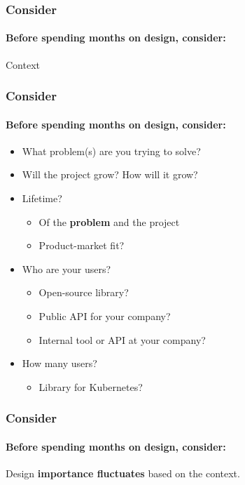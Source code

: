 
\begin{frame}
  \frametitle{Consider}
  \framesubtitle{Before spending months on design, consider:}

  \centering
  \LARGE Context
\end{frame}

\begin{frame}
  \frametitle{Consider}
  \framesubtitle{Before spending months on design, consider:}

  \begin{itemize}
    \item What problem(s) are you trying to solve?
    \pause
    \item Will the project grow? How will it grow?
    \pause
    \item Lifetime?
    \begin{itemize}
      \item Of the \textbf{problem} and the project
      \item Product-market fit?
    \end{itemize}
    \pause
    \item Who are your users?
    \begin{itemize}
      \item Open-source library?
      \item Public API for your company?
      \item Internal tool or API at your company?
    \end{itemize}
    \pause
    \item How many users?
    \begin{itemize}
      \item Library for Kubernetes?
    \end{itemize}
\end{itemize}
\end{frame}

\begin{frame}
  \frametitle{Consider}
  \framesubtitle{Before spending months on design, consider:}

  \centering
  Design \textbf{importance fluctuates} based on the context.
\end{frame}

